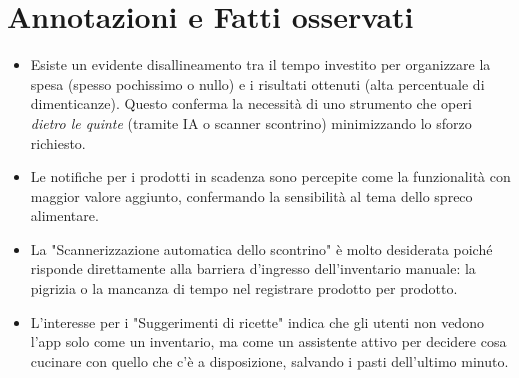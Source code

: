 \documentclass[12pt,a4paper]{article}
\begin{document}
\section{Annotazioni e Fatti osservati}
\begin{itemize}
    \item Esiste un evidente disallineamento tra il tempo investito per organizzare la spesa (spesso pochissimo o nullo) e i risultati ottenuti (alta percentuale di dimenticanze). Questo conferma la necessità di uno strumento che operi \textit{dietro le quinte} (tramite IA o scanner scontrino) minimizzando lo sforzo richiesto.
    \item Le notifiche per i prodotti in scadenza sono percepite come la funzionalità con maggior valore aggiunto, confermando la sensibilità al tema dello spreco alimentare.
    \item La "Scannerizzazione automatica dello scontrino" è molto desiderata poiché risponde direttamente alla barriera d'ingresso dell'inventario manuale: la pigrizia o la mancanza di tempo nel registrare prodotto per prodotto.
    \item L'interesse per i "Suggerimenti di ricette" indica che gli utenti non vedono l'app solo come un inventario, ma come un assistente attivo per decidere cosa cucinare con quello che c'è a disposizione, salvando i pasti dell'ultimo minuto.
\end{itemize}
\end{document}
